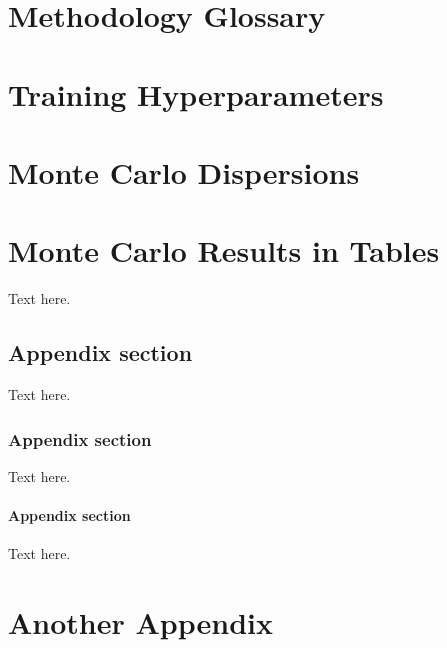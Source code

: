 \chapter{Methodology Glossary}
\label{appendix:glossary}



\chapter{Training Hyperparameters}
\label{appendix:hyperparameters}



\chapter{Monte Carlo Dispersions}
\label{appendix:dispersions}



\chapter{Monte Carlo Results in Tables}
\label{appendix:MC_Tables}






Text here.
\section{Appendix section}
Text here.
\subsection{Appendix section}
Text here.
\subsubsection{Appendix section}
Text here.
\chapter{Another Appendix}
